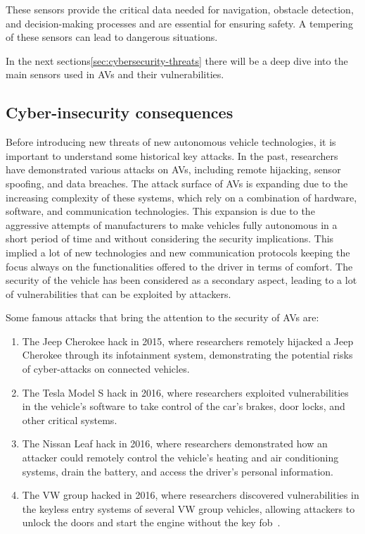 These sensors provide the critical data needed for navigation, obstacle
detection, and decision-making processes and are essential for ensuring safety.
A tempering of these sensors can lead to dangerous situations\cite{unknown2020connected,cybersec}.

In the next sections\ref{sec:cybersecurity-threats} there will be a deep dive into the main sensors used in AVs and their vulnerabilities.

\subsection{Cyber-insecurity consequences}\label{subsec:cyber-insecurity}

Before introducing new threats of new autonomous vehicle technologies, it is important to understand some historical key attacks.
In the past, researchers have demonstrated various attacks on AVs, including remote hijacking, sensor spoofing, and data breaches.
The attack surface of AVs is expanding due to the increasing complexity of these systems, which rely on a combination of hardware, software, and communication technologies\cite{cybersec}.
This expansion is due to the aggressive attempts of manufacturers to
make vehicles fully autonomous in a short period of time and without considering the security implications.
This implied a lot of new technologies and new communication protocols keeping the focus always on the functionalities offered to the driver in terms of comfort.
The security of the vehicle has been considered as a secondary aspect, leading to a lot of vulnerabilities that can be exploited by attackers.

Some famous attacks that bring the attention to the security of AVs are:
\begin{enumerate}
    \item The Jeep Cherokee hack in 2015, where researchers remotely hijacked a Jeep Cherokee through its infotainment system, demonstrating the potential risks of cyber-attacks on connected vehicles\cite{miller2015remote}.
    \item The Tesla Model S hack in 2016, where researchers exploited vulnerabilities in the vehicle's software to take control of the car's brakes, door locks, and other critical systems\cite{tesla_hack}.
    \item The Nissan Leaf hack in 2016, where researchers demonstrated how an attacker could remotely control the vehicle's heating and air conditioning systems, drain the battery, and access the driver's personal information.
    \item The VW group hacked in 2016, where researchers discovered vulnerabilities in the keyless entry systems of several VW group vehicles, allowing attackers to unlock the doors and start the engine without the key fob~\cite{garcia2016lock}.
\end{enumerate}

